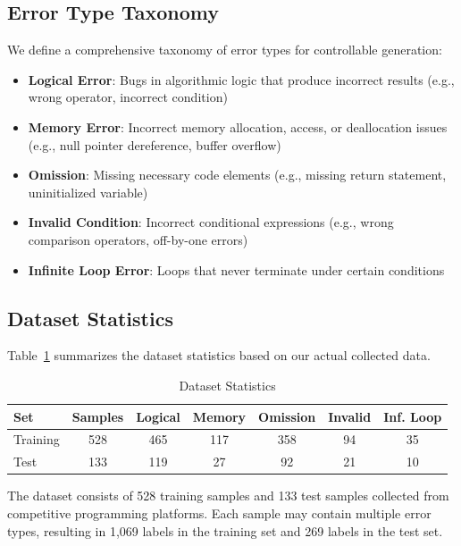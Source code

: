 \subsection{Error Type Taxonomy}

We define a comprehensive taxonomy of error types for controllable generation:

\begin{itemize}
    \item \textbf{Logical Error}: Bugs in algorithmic logic that produce incorrect results (e.g., wrong operator, incorrect condition)
    \item \textbf{Memory Error}: Incorrect memory allocation, access, or deallocation issues (e.g., null pointer dereference, buffer overflow)
    \item \textbf{Omission}: Missing necessary code elements (e.g., missing return statement, uninitialized variable)
    \item \textbf{Invalid Condition}: Incorrect conditional expressions (e.g., wrong comparison operators, off-by-one errors)
    \item \textbf{Infinite Loop Error}: Loops that never terminate under certain conditions
\end{itemize}

\subsection{Dataset Statistics}

Table~\ref{tab:dataset_statistics} summarizes the dataset statistics based on our actual collected data.

\begin{table}[h]
\centering
\caption{Dataset Statistics}
\label{tab:dataset_statistics}
\begin{tabular}{lcccccc}
\toprule
\textbf{Set} & \textbf{Samples} & \textbf{Logical} & \textbf{Memory} & \textbf{Omission} & \textbf{Invalid} & \textbf{Inf. Loop} \\
\midrule
Training & 528 & 465 & 117 & 358 & 94 & 35 \\
Test & 133 & 119 & 27 & 92 & 21 & 10 \\
\bottomrule
\end{tabular}
\end{table}

The dataset consists of 528 training samples and 133 test samples collected from competitive programming platforms. Each sample may contain multiple error types, resulting in 1,069 labels in the training set and 269 labels in the test set.

